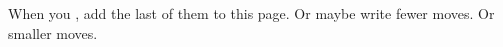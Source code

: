 \documentclass{dw2_playbook}
\begin{document}
%
\pageThree
    {
        \advancedMovesCont
    }
    {
      {
        When you , add the last of them to this page.  Or maybe write fewer moves.  Or smaller moves.
      }
    }
    {
      ~ %
    }



\clearpage
~

\resourceLinksPage
    {
    }
\end{document}
